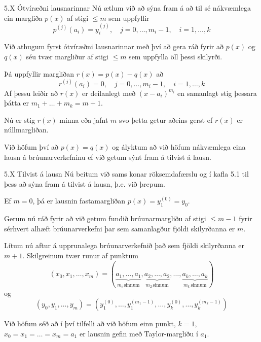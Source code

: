 \begin{frame}{5.X Ótvíræðni lausnarinnar} 
Nú ætlum við að sýna fram á að til sé nákvæmlega ein margliða 
$p(x)$ af stigi $\leq m$ sem uppfyllir 
\begin{equation*}
  p^{(j)}(a_i) = y_i^{(j)}, 
  \quad j = 0, \ldots, m_i-1, \quad i = 1, \ldots, k
\end{equation*}

\pause
Við athugum fyrst ótvíræðni lausnarinnar með því að gera ráð fyrir 
að $p(x)$ og $q(x)$ séu tvær margliður af stigi $\leq m$ sem 
uppfylla öll þessi skilyrði.

\pause
Þá uppfyllir margliðan $r(x) = p(x) - q(x)$ að
\begin{equation*}
  r^{(j)}(a_i) = 0, \quad j = 0, \ldots, m_i-1,
  \quad i = 1, \ldots,k
\end{equation*}
\pause
Af þessu leiðir að $r(x)$ er deilanlegt með $(x-a_i)^{m_i}$ en 
samanlagt stig þessara þátta er $m_1 + \ldots + m_k = m + 1$. 

\pause
Nú er stig $r(x)$ minna eða jafnt $m$ svo þetta getur aðeins gerst 
ef $r(x)$ er núllmargliðan. 

\pause
Við höfum því að $p(x) = q(x)$ og ályktum að við höfum nákvæmlega 
eina lausn á brúunarverkefninu  ef við getum 
sýnt fram á tilvist á lausn.
\end{frame}

\begin{frame}{5.X Tilvist á lausn} 
Nú beitum við sams konar röksemdafærslu og í kafla 5.1 
til þess að sýna fram á tilvist á lausn, þ.e. við þrepum.

\pause
Ef $m = 0$, þá er lausnin fastamargliðan $p(x) = y_1^{(0)}=y_0$.

\pause
\smallskip
Gerum nú ráð fyrir 
að við getum fundið brúunarmargliðu af stigi $\leq m-1$ fyrir 
sérhvert alhæft brúunarverkefni þar 
sem samanlagður fjöldi skilyrðanna er $m$.

\pause
\smallskip
Lítum nú aftur á upprunalega brúunarverkefnið það sem fjöldi
skilyrðanna er $m+1$.   Skilgreinum tvær runur af punktum
\begin{equation*}
  (x_0,x_1,\ldots,x_m) = 
  (\underbrace{a_1, \ldots, a_1}_{m_i \, \text{sinnum}}, 
  \underbrace{a_2, \ldots , a_2}_{m_2 \, \text{sinnum}}, 
  \ldots , 
  \underbrace{a_k, \ldots , a_k}_{m_k \, \text{sinnum}}) 
\end{equation*}
og
\begin{equation*}
  (y_0,y_1,\ldots,y_m) = 
  (y_1^{(0)}, \ldots, y_1^{(m_1-1)}, \ldots,
  y_k^{(0)}, \ldots, y_k^{(m_k-1)})
\end{equation*}

\pause
\smallskip
Við höfum séð að í því tilfelli að við höfum einn punkt, $k=1$,  
$x_0 = x_1 = \ldots = x_m = a_1$  er lausnin gefin 
með Taylor-margliðu í $a_1$. 
\end{frame}

